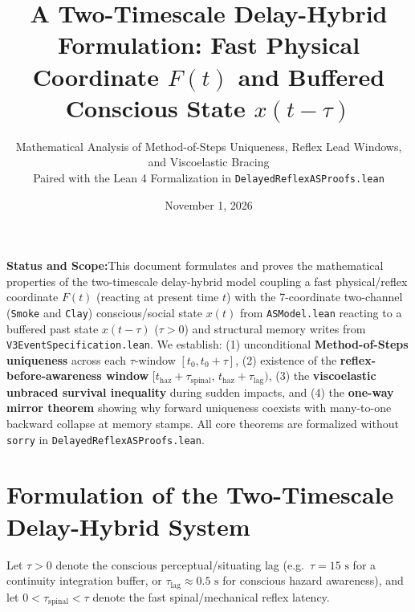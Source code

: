 \documentclass[11pt,a4paper]{article}
\title{\textbf{\color{primary}A Two-Timescale Delay-Hybrid Formulation: Fast Physical Coordinate $F(t)$ and Buffered Conscious State $x(t - \tau)$}}
\author{Mathematical Analysis of Method-of-Steps Uniqueness, Reflex Lead Windows, and Viscoelastic Bracing\\
\small Paired with the Lean 4 Formalization in \texttt{DelayedReflexASProofs.lean}}
\date{November 1, 2026}
\newcommand{\takeaway}[2]{%
  \vspace{6pt}\noindent\colorbox{primary!8}{%
    \parbox{\dimexpr\textwidth-2\fboxsep\relax}{%
      \vspace{3pt}\raggedright\textbf{\color{primary}#1:}\hspace{0.5em}#2\vspace{3pt}%
    }%
  }\vspace{6pt}%
}
\theoremstyle{definition}
\begin{document}
\maketitle

\takeaway{Status and Scope}{This document formulates and proves the mathematical properties of the two-timescale delay-hybrid model coupling a fast physical/reflex coordinate $F(t)$ (reacting at present time $t$) with the 7-coordinate two-channel (\texttt{Smoke} and \texttt{Clay}) conscious/social state $x(t)$ from \texttt{ASModel.lean} reacting to a buffered past state $x(t - \tau)$ ($\tau > 0$) and structural memory writes from \texttt{V3EventSpecification.lean}. We establish: (1) unconditional \textbf{Method-of-Steps uniqueness} across each $\tau$-window $[t_0, t_0+\tau]$, (2) existence of the \textbf{reflex-before-awareness window} $[t_{\mathrm{haz}}+\tau_{\mathrm{spinal}},\, t_{\mathrm{haz}}+\tau_{\mathrm{lag}})$, (3) the \textbf{viscoelastic unbraced survival inequality} during sudden impacts, and (4) the \textbf{one-way mirror theorem} showing why forward uniqueness coexists with many-to-one backward collapse at memory stamps. All core theorems are formalized without \texttt{sorry} in \texttt{DelayedReflexASProofs.lean}.}

\section{Formulation of the Two-Timescale Delay-Hybrid System}

Let $\tau > 0$ denote the conscious perceptual/situating lag (e.g.\ $\tau = 15\text{ s}$ for a continuity integration buffer, or $\tau_{\mathrm{lag}} \approx 0.5\text{ s}$ for conscious hazard awareness), and let $0 < \tau_{\mathrm{spinal}} < \tau$ denote the fast spinal/mechanical reflex latency.
\end{document}
